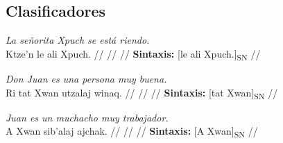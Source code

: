\documentclass{article}%
\begin{document}
\subsection{Clasificadores}%
\label{subsec:Clasificadores}%

%
\par\medskip%
\ex
\textit{La señorita Xpuch se está riendo.} \\
\begingl
\gla Ktze’n le ali Xpuch. //
\glb  //
\glc  //
\glft \textbf{Sintaxis:} [le ali Xpuch.]\textsubscript{SN} //
\endgl
\xe
%
\medskip%
\par\medskip%
\ex
\textit{Don Juan es una persona muy buena.} \\
\begingl
\gla Ri tat Xwan utzalaj winaq. //
\glb  //
\glc  //
\glft \textbf{Sintaxis:} [tat Xwan]\textsubscript{SN} //
\endgl
\xe
%
\medskip%
\par\medskip%
\ex
\textit{Juan es un muchacho muy trabajador.} \\
\begingl
\gla A Xwan sib’alaj ajchak. //
\glb  //
\glc  //
\glft \textbf{Sintaxis:} [A Xwan]\textsubscript{SN} //
\endgl
\xe
%
\medskip

%
\end{document}
